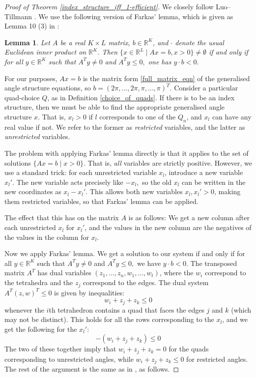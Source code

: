 \documentclass[12pt]{amsart}
\newtheorem{lemma}[thm]{Lemma}
\theoremstyle{definition}
\theoremstyle{remark}
\def\R{\mathbb{R}}
\begin{document}
\begin{proof}[Proof of Theorem \ref{index_structure_iff_1-efficient}]
We closely follow Luo--Tillmann \cite{LT}. We use the following version of Farkas' lemma, which is given as Lemma 10 (3) in \cite{LT}:

\begin{lemma}
Let $A$ be a real $K \times L$ matrix, $b\in\R^K$, and $\cdot$ denote the usual Euclidean inner product on $\R^K$. Then $\{x\in\R^L \mid Ax=b, x>0\} \neq \emptyset$ if and only if for all $y\in\R^K$ such that $A^Ty\neq 0$ and $A^Ty\leq 0,$ one has $y\cdot b<0.$
\end{lemma}

For our purposes, $Ax=b$ is the matrix form \eqref{full_matrix_eqn} of the generalised angle structure equations, so $b=(2\pi, \ldots, 2\pi, \pi, \ldots, \pi)^T$. Consider a particular quad-choice $Q$, as in Definition \ref{choice_of_quads}. If there is to be an index structure, then we must be able to find the appropriate generalised angle structure $x$. That is, $x_l>0$ if $l$ corresponds to one of the $Q_n$, and $x_l$ can have any real value if not. We refer to the former as \emph{restricted} variables, and the latter as \emph{unrestricted} variables.

The problem with applying Farkas' lemma directly is that it applies to the set of solutions $\{Ax=b \mid x>0\}$. That is, \emph{all} variables are strictly positive. However, we use a standard trick: for each unrestricted variable $x_l$, introduce a new variable $x_l'$. The
new variable acts precisely like $-x_l,$ so the old $x_l$ can be written in the new coordinates as $x_l - x_l'$. 
This allows both new variables $x_l, x_l' > 0$, making them restricted variables, so that Farkas' lemma can be applied.

The effect that this has on the matrix $A$ is as follows: We get a new column after each unrestricted $x_l$ for $x_l'$,
and the values in the new column are the negatives of the values in the column for $x_l$.

Now we apply Farkas' lemma. We get a solution to our system if and only if for all $y\in\R^K$ such that $A^Ty\neq 0$ and $A^Ty\leq 0,$ we have $y\cdot b<0.$ The transposed matrix $A^T$ has dual variables $(z_1, ..., z_n, w_1, ..., w_t)$, where the $w_i$
correspond to the tetrahedra and the $z_j$ correspond to the edges. The dual system $A^T(z,w)^T \leq 0$ is given by inequalities:
$$w_i + z_j + z_k \leq 0$$
whenever the $i$th tetrahedron contains a quad that faces the edges $j$ and $k$ (which may not be distinct). This holds for all the rows corresponding to the $x_l$, and we get the following for the $x_l'$:
$$-(w_i + z_j + z_k) \leq 0$$
The two of these together imply that $w_i + z_j + z_k = 0$ for the quads
corresponding to unrestricted angles, while $w_i + z_j + z_k \leq 0$ for restricted angles. 
The rest of the argument is the same as in \cite{LT}, as follows.


\end{proof}
\end{document}
